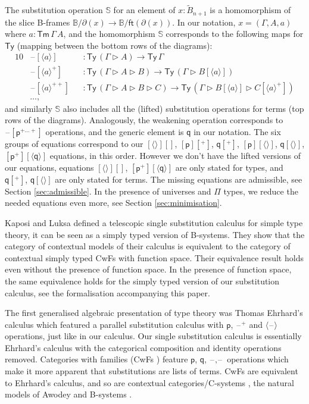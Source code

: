 \documentclass[sigplan,10pt,anonymous,review]{acmart}\settopmatter{printfolios=true,printccs=false,printacmref=false}
\newcommand{\ra}{\rightarrow}
\newcommand{\Ty}{\mathsf{Ty}}
\newcommand{\Tm}{\mathsf{Tm}}
\newcommand{\p}{\mathsf{p}}
\newcommand{\q}{\mathsf{q}}
\newcommand{\ext}{\mathop{\triangleright}}
\newcommand{\blank}{\mathord{\hspace{1pt}\text{--}\hspace{1pt}}} %
\begin{document}
The substitution operation $\mathbb{S}$ for an element of
$x:\tilde{B}_{n+1}$ is a homomorphism of the slice B-frames
$\mathbb{B}/\partial(x) \ra \mathbb{B}/\mathsf{ft}(\partial(x))$. In
our notation, $x = (\Gamma, A, a)$ where $a : \Tm\,\Gamma\,A$, and the
homomorphism $\mathbb{S}$ corresponds to the following maps for $\Ty$
(mapping between the bottom rows of the diagrams):
\begin{alignat*}{10}
  & \blank[\langle a\rangle] && : \Ty\,(\Gamma\ext A)\ra\Ty\,\Gamma \\
  & \blank[\langle a\rangle^+] && : \Ty\,(\Gamma\ext A\ext B)\ra\Ty\,(\Gamma\ext B[\langle a\rangle]) \\
  & \blank[\langle a\rangle^{++}] && : \Ty\,(\Gamma\ext A\ext B\ext C)\ra\Ty\,(\Gamma\ext B[\langle a\rangle]\ext C[\langle a\rangle^+]) \\
  & \dots,
\end{alignat*}
and similarly $\mathbb{S}$ also includes all the (lifted) substitution
operations for terms (top rows of the
diagrams). Analogously, the weakening operation corresponds to
$\blank[\p^{+\dots+}]$ operations, and the generic element is $\q$ in
our notation. The six groups of equations correspond to our
$[\langle\rangle][]$, $[\p][^+]$, $\q[^+]$, $[\p][\langle\rangle]$,
$\q[\langle\rangle]$, $[\p^+][\langle\q\rangle]$ equations, in this
order. However we don't have the lifted versions of our equations,
equations $[\langle\rangle][]$, $[\p^+][\langle\q\rangle]$ are only
stated for types, and $\q[^+]$, $\q[\langle\rangle]$ are only stated
for terms. The missing equations are admissible, see Section
\ref{sec:admissible}. In the presence of universes and $\Pi$ types, we
reduce the needed equations even more, see Section
\ref{sec:minimisation}.

Kaposi and Luksa \cite{luksa} defined a telescopic single substitution
calculus for simple type theory, it can be seen as a simply typed
version of B-systems. They show that the category of contextual models
of their calculus is equivalent to the category of contextual simply
typed CwFs with function space. Their equivalence result holds even
without the presence of function space. In the presence of function
space, the same equivalence holds for the simply typed version of our
substitution calculus, see the formalisation accompanying this paper.

The first generalised algebraic presentation of type theory was Thomas
Ehrhard's calculus \cite{ehrhard,coquandEhrhard} which featured a
parallel substitution calculus with $\p$, $\blank^+$ and
$\langle\blank\rangle$ operations, just like in our calculus. Our
single substitution calculus is essentially Ehrhard's calculus with
the categorical composition and identity operations
removed. Categories with families (CwFs
\cite{DBLP:conf/types/Dybjer95,Castellan2021}) feature $\p$, $\q$,
$\blank,\blank$ operations which make it more apparent that
substitutions are lists of terms. CwFs are equivalent to Ehrhard's
calculus, and so are contextual categories/C-systems
\cite{DBLP:journals/apal/Cartmell86,DBLP:journals/lmcs/AhrensLV18},
the natural models of Awodey \cite{DBLP:journals/mscs/Awodey18} and
B-systems \cite{AHRENS_EMMENEGGER_NORTH_RIJKE_2023}.
\end{document}
